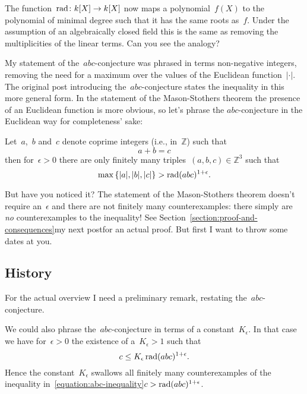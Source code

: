 The function~$\operatorname{rad}\colon k[X]\to k[X]$ now maps a polynomial~$f(X)$ to the polynomial of minimal degree such that it has the same roots as~$f$. Under the assumption of an algebraically closed field this is the same as removing the multiplicities of the linear terms. Can you see the analogy?

\begin{remark}
  My statement of the~$abc$\nobreakdash-conjecture was phrased in terms non-negative integers, removing the need for a maximum over the values of the Euclidean function~$|\cdot|$. The original post introducing the~$abc$\nobreakdash-conjecture states the inequality in this more general form. In the statement of the Mason-Stothers theorem the presence of an Euclidean function is more obvious, so let's phrase the $abc$-conjecture in the Euclidean way for completeness' sake:
\end{remark}

\begin{conjecture}
  Let~$a$,~$b$ and~$c$ denote coprime integers (i.e., in~$\mathbb{Z}$) such that
  \begin{equation}
    a+b=c
  \end{equation}
  then for~$\epsilon>0$ there are only finitely many triples~$(a,b,c)\in\mathbb{Z}^3$ such that
  \begin{equation}
    \max\left\{ |a|,|b|,|c| \right\}>\operatorname{rad}(abc)^{1+\epsilon}.
  \end{equation}
\end{conjecture}

But have you noticed it? The statement of the Mason-Stothers theorem doesn't require an~$\epsilon$ and there are not finitely many counterexamples: there simply are \emph{no} counterexamples to the inequality! See \iftex Section~\ref{section:proof-and-consequences}\fi\ifblog my next post\fi for an actual proof. But first I want to throw some dates at you.

\subsection{History}

For the actual overview I need a preliminary remark, restating the~$abc$\nobreakdash-conjecture.
\begin{remark}
  \label{remark:abc-with-factor}
  We could also phrase the~$abc$\nobreakdash-conjecture in terms of a constant~$K_{\epsilon}$. In that case we have for~$\epsilon>0$ the existence of a~$K_{\epsilon}>1$ such that
  \begin{equation}
    c\leq K_{\epsilon}\operatorname{rad}(abc)^{1+\epsilon}.
  \end{equation}
  Hence the constant~$K_{\epsilon}$ swallows all finitely many counterexamples of the inequality \iftex in~\eqref{equation:abc-inequality}\fi\ifblog$c>\operatorname{rad}(abc)^{1+\epsilon}$\fi.
\end{remark}

